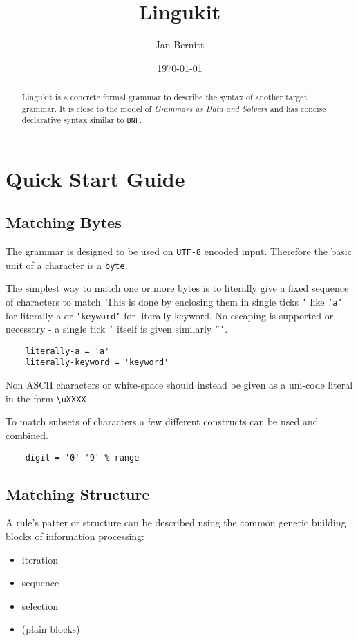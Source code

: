 \documentclass[10pt,a4paper]{article}
\begin{document}
\lstset{language=Haskell}
\title{Lingukit}
\author{Jan Bernitt}
\date{\today}
\maketitle

\begin{abstract}
\noindent Lingukit is a concrete formal grammar to describe the syntax of another target grammar. It is close to the model of \textit{Grammars as Data and Solvers} and has concise declarative syntax similar to \texttt{BNF}.
\end{abstract}

\section{Quick Start Guide}
\subsection{Matching Bytes}
The grammar is designed to be used on \texttt{UTF-8} encoded input. Therefore the basic unit of a character is a \texttt{byte}.

The simplest way to match one or more bytes is to literally give a fixed sequence of characters to match. This is done by enclosing them in single ticks \texttt{'} like \texttt{'a'} for literally a or \texttt{'keyword'} for literally keyword. No escaping is supported or necessary - a single tick \texttt{'} itself is given similarly \texttt{'''}.
\begin{verbatim}
    literally-a = 'a'
    literally-keyword = 'keyword'
\end{verbatim}
Non ASCII characters or white-space should instead be given as a uni-code literal in the form \verb!\uXXXX!

To match subsets of characters a few different constructs can be used and combined.
\begin{verbatim}
    digit = '0'-'9' % range
\end{verbatim}

\subsection{Matching Structure}
A rule's patter or structure can be described using the common generic building blocks of information processing:
\begin{itemize}
\item iteration
\item sequence
\item selection
\item (plain blocks)
\end{itemize}
\end{document}
